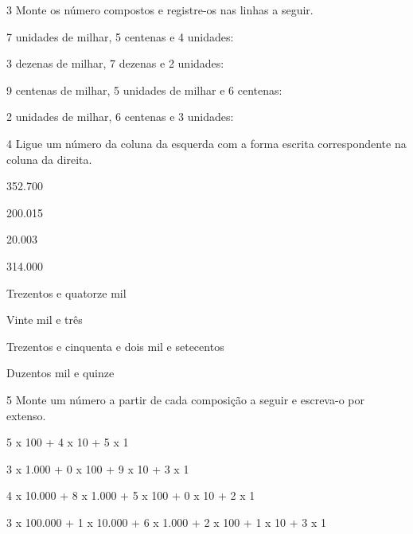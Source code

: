\num{3} Monte os número compostos e registre-os nas linhas a seguir.

\begin{escolha}
\item
  7 unidades de milhar, 5 centenas e 4 unidades: 

\item
  3 dezenas de milhar, 7 dezenas e 2 unidades: 

\item
  9 centenas de milhar, 5 unidades de milhar e 6 centenas: 

\item
  2 unidades de milhar, 6 centenas e 3 unidades: \reduline{2.603\hfill}
\end{escolha}


\num{4} Ligue um número da coluna da esquerda com a forma escrita correspondente na coluna da direita.

\begin{multicols}{2}
352.700 

200.015 

20.003 

314.000 

\columnbreak

Trezentos e quatorze mil

Vinte mil e três

Trezentos e cinquenta e dois mil e setecentos

Duzentos mil e quinze
\end{multicols}


\num{5} Monte um número a partir de cada composição a seguir e escreva-o por extenso.

\begin{escolha}
\item 5 x 100 + 4 x 10 + 5 x 1 

\item 3 x 1.000 + 0 x 100 + 9 x 10 + 3 x 1 

\item 4 x 10.000 + 8 x 1.000 + 5 x 100 + 0 x 10 + 2 x 1 

\item 3 x 100.000 + 1 x 10.000 + 6 x 1.000 + 2 x 100 + 1 x 10 + 3 x 1 
\end{escolha}

